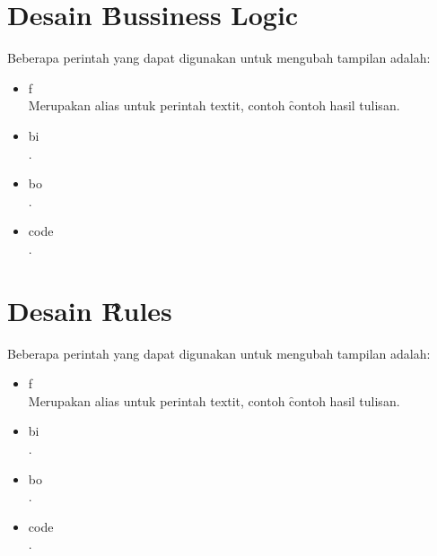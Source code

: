 \section{Desain \f{Bussiness Logic}}
Beberapa perintah yang dapat digunakan untuk mengubah tampilan adalah: 
\begin{itemize}
	\item \bslash f \\
		Merupakan alias untuk perintah \bslash textit, contoh 
		\f{contoh hasil tulisan}.
	\item \bslash bi \\
		.
	\item \bslash bo \\
		.
	\item \bslash code \\ 
		.
\end{itemize}

\section{Desain \f{Rules}}
Beberapa perintah yang dapat digunakan untuk mengubah tampilan adalah: 
\begin{itemize}
	\item \bslash f \\
		Merupakan alias untuk perintah \bslash textit, contoh 
		\f{contoh hasil tulisan}.
	\item \bslash bi \\
		.
	\item \bslash bo \\
		.
	\item \bslash code \\ 
		.
\end{itemize}
